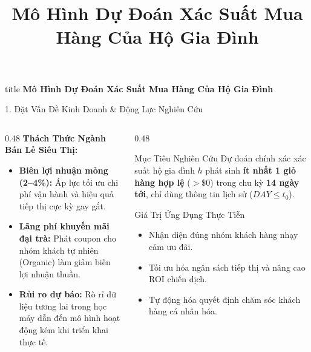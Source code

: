 \documentclass[aspectratio=169, 10pt]{beamer}
\title[Mô Hình Dự Đoán Mua Hàng]{\textbf{Mô Hình Dự Đoán Xác Suất Mua Hàng Của Hộ Gia Đình}}
\author{}
\institute{}
\date{}
\begin{document}
\begin{frame}[plain]
  \vfill
  \centering
  \begin{beamercolorbox}[sep=12pt,center,rounded=true,shadow=true]{title}
    \textbf{\Large Mô Hình Dự Đoán Xác Suất Mua Hàng Của Hộ Gia Đình}
  \end{beamercolorbox}
  \vfill
\end{frame}

\begin{frame}{1. Đặt Vấn Đề Kinh Doanh \& Động Lực Nghiên Cứu}
  \begin{columns}[T]
    \begin{column}{0.48\textwidth}
      \textbf{Thách Thức Ngành Bán Lẻ Siêu Thị:}
      \begin{itemize}\setlength{\itemsep}{5pt}
        \item \textbf{Biên lợi nhuận mỏng (2--4\%):} Áp lực tối ưu chi phí vận hành và hiệu quả tiếp thị cực kỳ gay gắt.
        \item \textbf{Lãng phí khuyến mãi đại trà:} Phát coupon cho nhóm khách tự nhiên (Organic) làm giảm biên lợi nhuận thuần.
        \item \textbf{Rủi ro dự báo:} Rò rỉ dữ liệu tương lai trong học máy dẫn đến mô hình hoạt động kém khi triển khai thực tế.
      \end{itemize}
    \end{column}
    
    \begin{column}{0.48\textwidth}
      \begin{alertblock}{Mục Tiêu Nghiên Cứu}
        Dự đoán chính xác xác suất hộ gia đình $h$ phát sinh \textbf{ít nhất 1 giỏ hàng hợp lệ} ($> \$0$) trong chu kỳ \textbf{14 ngày tới}, chỉ dùng thông tin lịch sử ($DAY \le t_0$).
      \end{alertblock}
      \vspace{0.25cm}
      \begin{exampleblock}{Giá Trị Ứng Dụng Thực Tiễn}
        \begin{itemize}\setlength{\itemsep}{3pt}
          \item Nhận diện đúng nhóm khách hàng nhạy cảm ưu đãi.
          \item Tối ưu hóa ngân sách tiếp thị và nâng cao ROI chiến dịch.
          \item Tự động hóa quyết định chăm sóc khách hàng cá nhân hóa.
        \end{itemize}
      \end{exampleblock}
    \end{column}
  \end{columns}
\end{frame}
\end{document}
